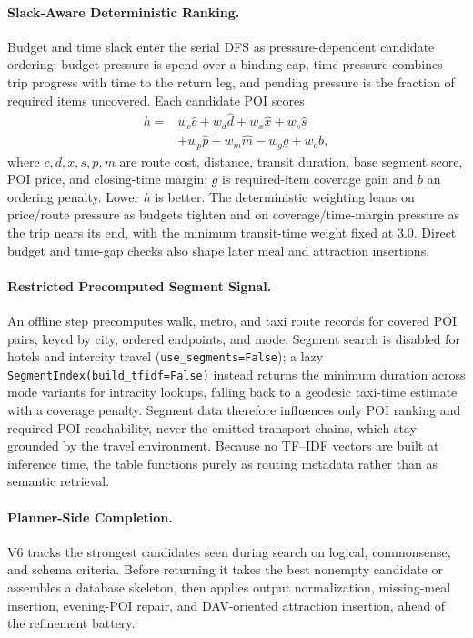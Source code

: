 \documentclass{article}
\begin{document}
\paragraph{Slack-Aware Deterministic Ranking.}
Budget and time slack enter the serial DFS as pressure-dependent candidate
ordering: budget pressure is spend over a binding cap, time pressure
combines trip progress with time to the return leg, and pending pressure is
the fraction of required items uncovered. Each candidate POI scores
\begin{equation*}
\begin{split}
h={}&w_c\hat c+w_d\hat d+w_x\hat x+w_s\hat s\\
   &+w_p\hat p+w_m\hat m-w_g g+w_o b,
\end{split}
\end{equation*}
where $c,d,x,s,p,m$ are route cost, distance, transit duration, base
segment score, POI price, and closing-time margin; $g$ is required-item
coverage gain and $b$ an ordering penalty. Lower $h$ is better. The deterministic weighting leans on price/route pressure as budgets
tighten and on coverage/time-margin pressure as the trip nears its end,
with the minimum transit-time weight fixed at 3.0. Direct budget and
time-gap checks also shape later meal and attraction insertions.
 
\paragraph{Restricted Precomputed Segment Signal.}
An offline step precomputes walk, metro, and taxi route records for covered
POI pairs, keyed by city, ordered endpoints, and mode. Segment search is
disabled for hotels and intercity travel (\texttt{use\_segments=False}); a
lazy \texttt{SegmentIndex(build\_tfidf=False)} instead returns the minimum
duration across mode variants for intracity lookups, falling back to a
geodesic taxi-time estimate with a coverage penalty.
Segment data therefore influences only POI ranking and required-POI
reachability, never the emitted transport chains, which stay grounded by
the travel environment. Because no TF--IDF vectors are built at inference
time, the table functions purely as routing metadata rather than as
semantic retrieval.
 
\paragraph{Planner-Side Completion.}
V6 tracks the strongest candidates seen during search on logical,
commonsense, and schema criteria. Before returning it takes the best
nonempty candidate or assembles a database skeleton, then applies output
normalization, missing-meal insertion, evening-POI repair, and DAV-oriented
attraction insertion, ahead of the refinement battery.
 
\end{document}
